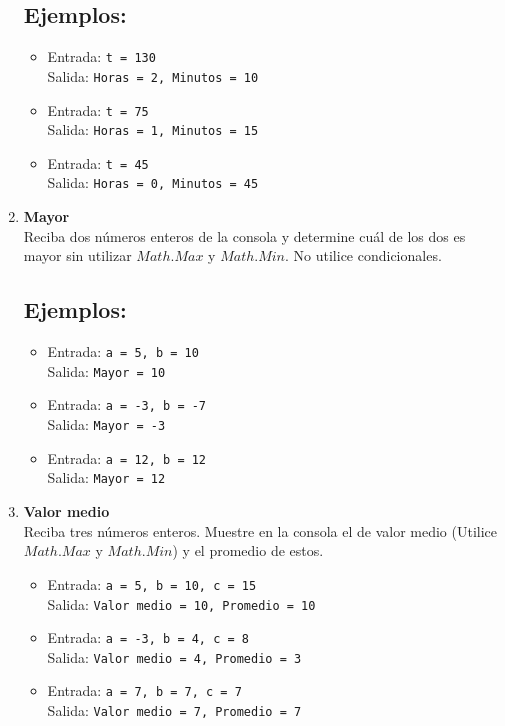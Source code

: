 \begin{enumerate}
    \subsection*{Ejemplos:}
    \begin{itemize}
    \item Entrada: \texttt{t = 130}\\
          Salida: \texttt{Horas = 2, Minutos = 10}
    \item Entrada: \texttt{t = 75}\\
          Salida: \texttt{Horas = 1, Minutos = 15}
    \item Entrada: \texttt{t = 45}\\
          Salida: \texttt{Horas = 0, Minutos = 45}
\end{itemize}
    
    \item \textbf{Mayor}\\
    Reciba dos números enteros de la consola y determine cuál de los dos es mayor sin utilizar $Math.Max$ y $Math.Min$. No utilice condicionales.
    \subsection*{Ejemplos:}
    \begin{itemize}
    \item Entrada: \texttt{a = 5, b = 10}\\
          Salida: \texttt{Mayor = 10}
    \item Entrada: \texttt{a = -3, b = -7}\\
          Salida: \texttt{Mayor = -3}
    \item Entrada: \texttt{a = 12, b = 12}\\
          Salida: \texttt{Mayor = 12}
    \end{itemize}
    
    \item \textbf{Valor medio}\\
    Reciba tres números enteros. Muestre en la consola el de valor medio (Utilice $Math.Max$ y $Math.Min$) y el promedio de estos.
    \begin{itemize}
    \subsection*{Ejemplos:}
    \item Entrada: \texttt{a = 5, b = 10, c = 15}\\
          Salida: \texttt{Valor medio = 10, Promedio = 10}
    \item Entrada: \texttt{a = -3, b = 4, c = 8}\\
          Salida: \texttt{Valor medio = 4, Promedio = 3}
    \item Entrada: \texttt{a = 7, b = 7, c = 7}\\
          Salida: \texttt{Valor medio = 7, Promedio = 7}
\end{itemize}
        

\end{enumerate}

